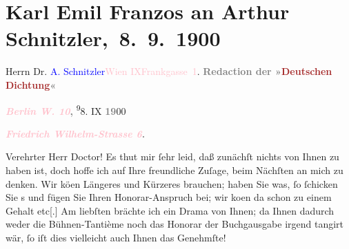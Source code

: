 

\renewcommand{\erwaehntePersonen}{Personen: Karl Emil Franzos}
\renewcommand{\erwaehnteInstitutionen}{Institutionen: Deutsche Dichtung}
\renewcommand{\erwaehnteOrte}{Orte: Berlin, Berlin W, Frankgasse 1, Friedrich Wilhelm-Strasse 6, IX., Alsergrund, Wien}
\renewcommand{\erwaehnteWerke}{}
\section[ Karl Emil Franzos an Arthur Schnitzler, 8. 9. 1900]{Karl Emil Franzos an Arthur Schnitzler, 8. 9. 1900}
\nopagebreak{}
\rehead{ }\normalsize\beginnumbering{}
\toendnotes[C]{\smallbreak\pagebreak[2]}
\pstart{}{\pb}Herrn Dr. \textcolor{blue}{A.
                     Schnitzler}{}\ledrightnote{}\pend{}\pstart{}\textcolor{pink}{Wien IX}{}\ledrightnote{\textcolor{pink}{IX., Alsergrund}}\pend{}\pstart{}\textcolor{pink}{Frankgasse 1}{}\ledrightnote{\textcolor{pink}{Frankgasse 1}}.\pend{}
{\bigskip}
\pstart
           \centering{}{\pb}\textcolor{gray}{\textbf{Redaction der »\textcolor{brown}{Deutschen
                        Dichtung}{}\ledrightnote{\textcolor{brown}{Deutsche Dichtung}}«}}\pend
           
\pstart
           \raggedleft{}\textcolor{gray}{\textbf{\textbf{\emph{\textcolor{pink}{Berlin W. 10}{}\ledrightnote{\textcolor{pink}{Berlin W}}}},}}{ }\substVorne{}\textsuperscript{9}\substDazwischen{}8\substHinten{}. IX \textcolor{gray}{\textbf{19}}00\pend
           
\pstart
           \raggedleft{}\textcolor{gray}{\textbf{\emph{\textcolor{pink}{Friedrich Wilhelm-Strasse 6}{}\ledrightnote{\textcolor{pink}{Friedrich Wilhelm-Strasse 6}}}.}}\pend
           
\pstart{}Verehrter Herr Doctor!\pend
\pstart
           Es thut mir ſehr leid, daß zunächſt nichts von Ihnen zu haben ist, doch hoffe ich auf
               Ihre freundliche Zuſage, beim Nächſten an mich zu denken. Wir kö{\geminationn}en Längeres und Kürzeres brauchen; haben Sie was, ſo
               ſchicken Sie s und fügen Sie Ihren Honorar-Anspruch bei; wir ko{\geminationm}en da{\geminationn} schon zu einem
               Gehalt etc{[}.{]} Am liebſten brächte ich ein Drama von Ihnen; da
               Ihnen dadurch weder die Bühnen-Tantième noch das Honorar der Buchgausgabe irgend
               tangirt wär, ſo iſt dies vielleicht auch Ihnen das Genehmſte!\pend
           
